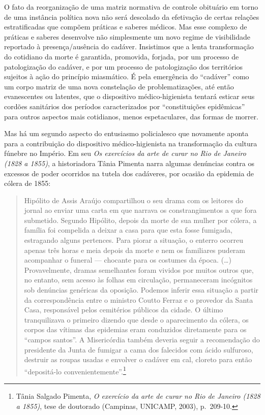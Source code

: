 O fato da reorganização de uma matriz normativa de controle obituário em
torno de uma instância política nova não será descolado da efetivação de
certas relações estratificadas que compõem práticas e saberes médicos.
Mas esse complexo de práticas e saberes desenvolve não simplesmente um
novo regime de visibilidade reportado à presença/ausência do cadáver.
Insistimos que a lenta transformação do cotidiano da morte é garantida,
promovida, forjada, por um processo de patologização do cadáver, e por
um processo de patologização dos territórios sujeitos à ação do
princípio miasmático. É pela emergência do ``cadáver'' como um corpo
matriz de uma nova constelação de problematizações, até então
evanescentes ou latentes, que o dispositivo médico-higienista tentará
esticar seus cordões sanitários dos períodos caracterizados por
``constituições epidêmicas'' para outros aspectos mais cotidianos, menos
espetaculares, das formas de morrer.

Mas há um segundo aspecto do entusiasmo policialesco que novamente
aponta para a contribuição do dispositivo médico-higienista na
transformação da cultura fúnebre no Império. Em seu \textit{Os exercícios
da arte de curar no Rio de Janeiro (1828 a 1855)}, a historiadora Tânia
Pimenta narra algumas denúncias contra os excessos de poder ocorridos na
tutela dos cadáveres, por ocasião da epidemia de cólera de 1855:

\begin{quote}
Hipólito de Assis Araújo compartilhou o seu drama com os leitores do
jornal ao enviar uma carta em que narrava os constrangimentos a que fora
submetido. Segundo Hipólito, depois da morte de sua mulher por cólera, a
família foi compelida a deixar a casa para que esta fosse fumigada,
estragando alguns pertences. Para piorar a situação, o enterro ocorreu
apenas três horas e meia depois da morte e nem os familiares puderam
acompanhar o funeral --- chocante para os costumes da época. (\ldots{})
Provavelmente, dramas semelhantes foram vividos por muitos outros que,
no entanto, sem acesso às folhas em circulação, permaneceram incógnitos
sob denúncias genéricas da oposição. Podemos inferir essa situação a
partir da correspondência entre o ministro Coutto Ferraz e o provedor da
Santa Casa, responsável pelos cemitérios públicos da cidade. O último
tranquilizava o primeiro dizendo que desde o aparecimento da cólera, os
corpos das vítimas das epidemias eram conduzidos diretamente para os
``campos santos''. A Misericórdia também deveria seguir a recomendação
do presidente da Junta de fumigar a cama dos falecidos com ácido
sulfuroso, destruir as roupas usadas e envolver o cadáver em cal,
cloreto para então ``depositá-lo convenientemente''.\footnote{Tânia
  Salgado Pimenta, \textit{O exercício da arte de curar no Rio de Janeiro
  (1828 a 1855)}, tese de doutorado (Campinas, UNICAMP, 2003),
  p.~209-10.}
\end{quote}

